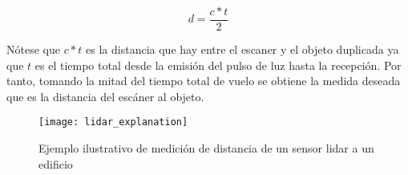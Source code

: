 $$d = \frac{c*t}{2}$$

Nótese que $c*t$ es la distancia que hay entre el escaner y el objeto duplicada ya que $t$ es el tiempo total desde la emisión del pulso de luz hasta la recepción. Por tanto, tomando la mitad del tiempo total de vuelo se obtiene la medida deseada que es la distancia del escáner al objeto.

\begin{figure}
\centering
{}
  \texttt{[image: lidar\_explanation]}
  \caption{Ejemplo ilustrativo de medición de distancia de un sensor lidar a un edificio}\label{fig:lidar explanation}
\endminipage\hfill

\end{figure}

\iffalse
Para cada pulso de luz emitido se detecta un punto en concreto lo que hace pensar que para poder crear nubes con millones de puntos la velocidad de generación de los pulsos ha de ser elevada. En el caso de lidar se pueden emitir hasta 150000 pulsos en un segundo.
\\
\\
De este modo, al ser capaz de medir la distancia que hay desde el punto de emisión de los rayos de luz hasta la superficie en la que rebotan, el sensor puede detectar rápidamente formas definidas de objetos, edificios o paisajes considerando en conjunto de puntos detectados tal y como se ha mostrado en ejemplos del apartado \ref{section:nubes_ejemplo}
\fi
